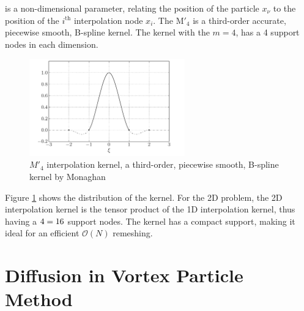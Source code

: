 is a non-dimensional parameter, relating the position of the particle $x_{\nu}$ to the position of the $i^{\mathrm{th}}$ interpolation node $x_i$. The $\mathrm{M'}_4$ is a third-order accurate, piecewise smooth, B-spline kernel. The kernel with the $m = 4$, has a 4 support nodes in each dimension. 

	\begin{figure}[!b]
	\centering
	\includegraphics[width=0.6\textwidth]{figures/lagrangian/interpolationKernel.pdf}
	\caption{$M'_4$ interpolation kernel, a third-order, piecewise smooth, B-spline kernel by Monaghan \cite{Monaghan1985}}
	\label{fig:interpolationKernel}
	\end{figure}

Figure \ref{fig:interpolationKernel} shows the distribution of the kernel. For the 2D problem, the 2D interpolation kernel is the tensor product of the 1D interpolation kernel, thus having a $4\time4 = 16$ support nodes. The kernel has a compact support, making it ideal for an efficient $\mathcal{O}(N)$ remeshing.

%
%
%	

\section{Diffusion in Vortex Particle Method}
\label{sec:diffusionVM}

